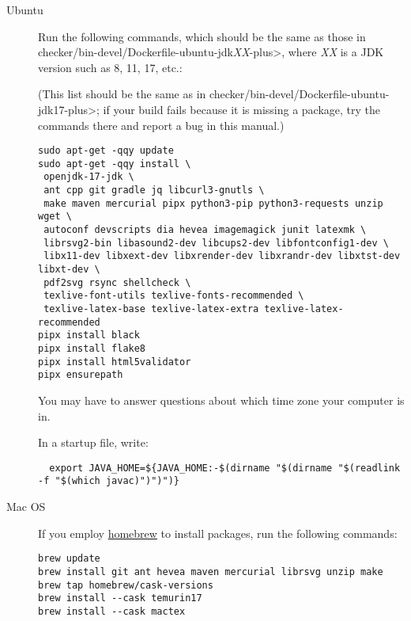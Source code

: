 \begin{description}
\item[Ubuntu]
  Run the following commands, which should be the same as those in
  \<checker/bin-devel/Dockerfile-ubuntu-jdk\emph{XX}-plus>, where \emph{XX}
  is a JDK version such as 8, 11, 17, etc.:

(This list should be the same as in
\<checker/bin-devel/Dockerfile-ubuntu-jdk17-plus>; if your build fails
because it is missing a package, try the commands there and report a bug
in this manual.)


\begin{Verbatim}
sudo apt-get -qqy update
sudo apt-get -qqy install \
 openjdk-17-jdk \
 ant cpp git gradle jq libcurl3-gnutls \
 make maven mercurial pipx python3-pip python3-requests unzip wget \
 autoconf devscripts dia hevea imagemagick junit latexmk \
 librsvg2-bin libasound2-dev libcups2-dev libfontconfig1-dev \
 libx11-dev libxext-dev libxrender-dev libxrandr-dev libxtst-dev libxt-dev \
 pdf2svg rsync shellcheck \
 texlive-font-utils texlive-fonts-recommended \
 texlive-latex-base texlive-latex-extra texlive-latex-recommended
pipx install black
pipx install flake8
pipx install html5validator
pipx ensurepath
\end{Verbatim}

  You may have to answer questions about which time zone your computer is in.

In a startup file, write:
\begin{smaller}
\begin{Verbatim}
  export JAVA_HOME=${JAVA_HOME:-$(dirname "$(dirname "$(readlink -f "$(which javac)")")")}
\end{Verbatim}
\end{smaller}

\item[Mac OS]
  If you employ \href{https://brew.sh}{homebrew} to install packages, run
  the following commands:

\begin{Verbatim}
brew update
brew install git ant hevea maven mercurial librsvg unzip make
brew tap homebrew/cask-versions
brew install --cask temurin17
brew install --cask mactex
\end{Verbatim}


\end{description}
